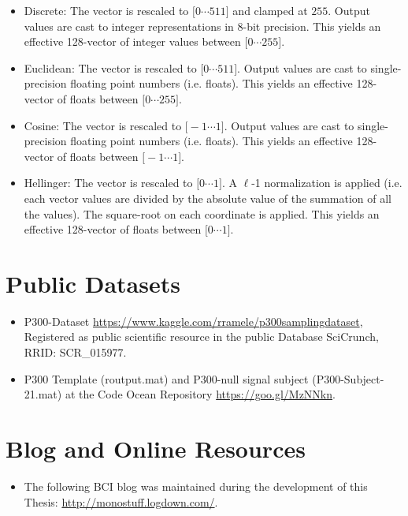 \begin{itemize}
\item Discrete:  The vector is rescaled to $ \big[  0 \cdots 511 \big] $ and clamped at $255$.  Output values are cast to integer representations in 8-bit precision.  This yields an effective 128-vector of integer values between $ \big[  0 \cdots 255 \big] $.
\item Euclidean: The vector is rescaled to $ \big[  0 \cdots 511 \big]  $.  Output values are cast to single-precision floating point numbers (i.e. floats).  This yields an effective 128-vector of floats between $\big[  0 \cdots 255 \big] $.
\item Cosine: The vector is rescaled to $ \big[  -1  \cdots 1 \big] $.  Output values are cast to single-precision floating point numbers (i.e. floats).  This yields an effective 128-vector of floats between $\big[ -1 \cdots 1 \big] $.
\item Hellinger:  The vector is rescaled to $ \big[  0 \cdots 1 \big] $.  A $\ell$-1 normalization is applied (i.e. each vector values are divided by the absolute value of the summation of all the values).  The square-root on each coordinate is applied.  This yields an effective 128-vector of floats between $\big[  0 \cdots 1 \big] $.
\end{itemize}


\section{Public Datasets}

\begin{itemize}
\item P300-Dataset \url{https://www.kaggle.com/rramele/p300samplingdataset}, Registered as public scientific resource in the public Database SciCrunch, RRID: SCR\_015977. 
\item P300 Template (routput.mat) and P300-null signal subject (P300-Subject-21.mat) at the Code Ocean Repository \url{https://goo.gl/MzNNkn}.
\end{itemize}

\section{Blog and Online Resources}

\begin{itemize}
\item The following BCI blog was maintained during the development of this Thesis: \url{http://monostuff.logdown.com/}.
\end{itemize}

